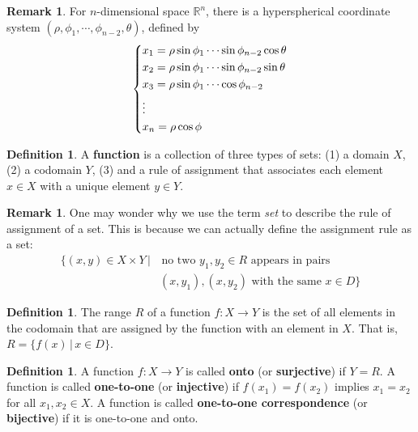 \documentclass{beamer}
\theoremstyle{plain}
\theoremstyle{definition}
\newtheorem{defn}[thm]{Definition}
\newtheorem{rem}[thm]{Remark}
\begin{document}
\begin{frame}
\begin{rem}
	For $n$-dimensional space $\mathbb R^n$,
	there is a hyperspherical coordinate system
	$(\rho,\phi_1,\cdots,\phi_{n-2},\theta)$, defined by
	$$\begin{dcases}
	x_1 = \rho\sin\phi_1\cdots
		\sin\phi_{n-2}\cos\theta \\
	x_2 = \rho\sin\phi_1\cdots
		\sin\phi_{n-2}\sin\theta \\
	x_3 = \rho\sin\phi_1\cdots\cos\phi_{n-2} \\
	\vdots\\
	x_n = \rho\cos\phi \end{dcases}$$
\end{rem}
\end{frame}

\begin{frame}
\begin{defn}
A \textbf{function} is a collection of three types of sets: (1) a domain $X$, (2) a codomain $Y$, (3) and a rule of assignment that associates each element $x\in X$ with a unique element $y\in Y$. 
\end{defn}
\begin{rem}
One may wonder why we use the term \emph{set} to describe the rule of assignment of a set. This is because we can actually define the assignment rule as a set:
	\begin{align*}
	\{(x,y)\in X\times Y\,|&\, \textrm{no two }y_1,y_2\in R\textrm{ appears in pairs} \\
	 &(x,y_1), (x,y_2)\textrm{ with the same }x\in D\}
	 \end{align*}
\end{rem}
\end{frame}

\begin{frame}
\begin{defn}
The \textrm{range} $R$ of a function $f:X\to Y$ is the set of all elements in the codomain that are assigned by the function with an element in $X$. That is, $R = \{f(x)\,|\,x\in D\}$.
\end{defn}
\begin{defn}
A function $f:X\to Y$ is called \textbf{onto} (or \textbf{surjective}) if $Y=R$. A function is called \textbf{one-to-one} (or \textbf{injective}) if $f(x_1)=f(x_2)$ implies $x_1=x_2$ for all $x_1,x_2\in X$. A function is called \textbf{one-to-one correspondence} (or \textbf{bijective}) if it is one-to-one and onto.
\end{defn}
\end{frame}
\end{document}
